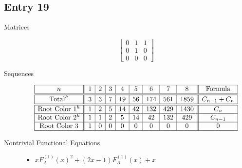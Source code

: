 \documentclass[12pt]{amsart}
\newcommand{\gff}[2]{F_{#2}^{(#1)}(x)}
\newcommand{\gfa}[1]{\gff{#1}{A}}
\begin{document}
\subsection*{Entry 19}
\begin{description}
    \item[Matrices]
    
    \[\begin{bmatrix}
0 & 1 & 1 \\
0 & 1 & 0 \\
0 & 0 & 0
\end{bmatrix}\]
    \item[Sequences]\hspace*{\fill}\vspace{-0.5cm}
    \begin{center}
        \[
        \begin{array}{|c||c|c|c|c|c|c|c|c||c|}\hline
           n  & 1 & 2 & 3 & 4 & 5 & 6 & 7 & 8  & \text{Formula}\\\hline\hline
           \text{Total}^{h}  & 3 & 3 & 7 & 19 & 56 & 174 & 561 & 1859 & C_{n-1} + C_{n}\\\hline\hline
           \text{Root Color }1^h & 1 & 2 & 5 & 14 & 42 & 132 & 429 & 1430 & C_n\\\hline
           \text{Root Color }2^h & 1 & 1 & 2 & 5 & 14 & 42 & 132 & 429 & C_{n-1}\\\hline
           \text{Root Color }3 & 1 & 0 & 0 & 0 & 0 & 0 & 0 & 0 & 0\\\hline
        \end{array}
        \]
    \end{center}
    
    \item[Nontrivial Functional Equations]\hspace*{\fill}

    \begin{itemize}
\item $x\gfa{1}^2+(2x - 1)\gfa{1}+x$



\end{itemize}
\end{description}
\end{document}
